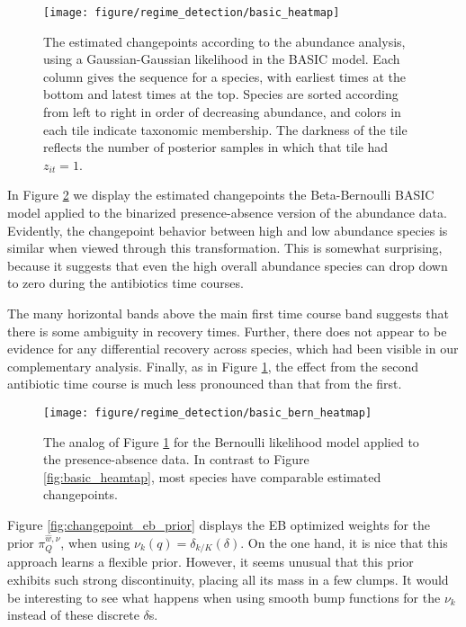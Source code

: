 \begin{figure}
  \centering
  \texttt{[image: figure/regime\_detection/basic\_heatmap]}
  \caption{The estimated changepoints according to the abundance analysis, using
    a Gaussian-Gaussian likelihood in the BASIC model. Each column gives the
    sequence for a species, with earliest times at the bottom and latest times
    at the top. Species are sorted according from left to right in order of
    decreasing abundance, and colors in each tile indicate taxonomic membership.
    The darkness of the tile reflects the number of posterior samples in which
    that tile had $z_{it} = 1$.
    \label{fig:basic_heatmap} }
\end{figure}

In Figure \ref{fig:basic_bern_heatmap} we display the estimated changepoints the
Beta-Bernoulli BASIC model applied to the binarized presence-absence version of
the abundance data. Evidently, the changepoint behavior between high and low
abundance species is similar when viewed through this transformation. This is
somewhat surprising, because it suggests that even the high overall abundance
species can drop down to zero during the antibiotics time courses.

The many horizontal bands above the main first time course band suggests that
there is some ambiguity in recovery times. Further, there does not appear to be
evidence for any differential recovery across species, which had been visible in
our complementary analysis. Finally, as in Figure \ref{fig:basic_heatmap}, the
effect from the second antibiotic time course is much less pronounced than that
from the first.

\begin{figure}
  \centering
  \texttt{[image: figure/regime\_detection/basic\_bern\_heatmap]}
  \caption{
    The analog of Figure \ref{fig:basic_heatmap} for the Bernoulli likelihood
    model applied to the presence-absence data. In contrast to Figure
    \ref{fig:basic_heamtap}, most species have comparable estimated
    changepoints.
    \label{fig:basic_bern_heatmap}
  }
\end{figure}

Figure \ref{fig:changepoint_eb_prior} displays the EB optimized weights for the
prior $\pi_{Q}^{\hat{w}, \nu}$, when using $\nu_{k}\left(q\right) = \delta_{k /
  K}\left(\delta\right)$. On the one hand, it is nice that this approach
learns a flexible prior. However, it seems unusual that this prior exhibits such
strong discontinuity, placing all its mass in a few clumps. It would be
interesting to see what happens when using smooth bump functions for the $\nu_k$
instead of these discrete $\delta$s.

